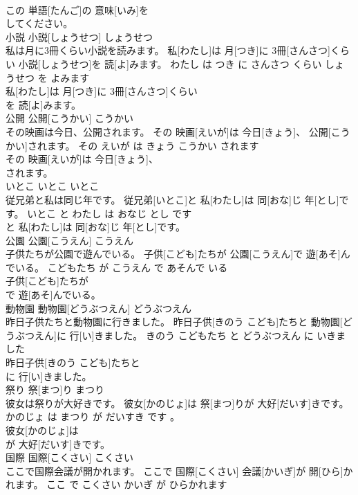 \documentclass[8pt]{extreport}
\begin{document}
\begin{CJK}{UTF8}{min}
\\	この 単語[たんご]の 意味[いみ]を
\\	してください。			
\\	小説	小説[しょうせつ]	しょうせつ	
\\	私は月に3冊くらい小説を読みます。	私[わたし]は 月[つき]に 3冊[さんさつ]くらい 小説[しょうせつ]を 読[よ]みます。	わたし は つき に さんさつ くらい しょうせつ を よみます	
\\	私[わたし]は 月[つき]に 3冊[さんさつ]くらい
\\	を 読[よ]みます。			
\\	公開	公開[こうかい]	こうかい	
\\	その映画は今日、公開されます。	その 映画[えいが]は 今日[きょう]、 公開[こうかい]されます。	その えいが は きょう こうかい されます	
\\	その 映画[えいが]は 今日[きょう]、
\\	されます。			
\\	いとこ	いとこ	いとこ	
\\	従兄弟と私は同じ年です。	従兄弟[いとこ]と 私[わたし]は 同[おな]じ 年[とし]です。	いとこ と わたし は おなじ とし です	
\\	と 私[わたし]は 同[おな]じ 年[とし]です。			
\\	公園	公園[こうえん]	こうえん	
\\	子供たちが公園で遊んでいる。	子供[こども]たちが 公園[こうえん]で 遊[あそ]んでいる。	こどもたち が こうえん で あそんで いる	
\\	子供[こども]たちが
\\	で 遊[あそ]んでいる。			
\\	動物園	動物園[どうぶつえん]	どうぶつえん	
\\	昨日子供たちと動物園に行きました。	昨日子供[きのう こども]たちと 動物園[どうぶつえん]に 行[い]きました。	きのう こどもたち と どうぶつえん に いきました	
\\	昨日子供[きのう こども]たちと
\\	に 行[い]きました。			
\\	祭り	祭[まつ]り	まつり	
\\	彼女は祭りが大好きです。	彼女[かのじょ]は 祭[まつ]りが 大好[だいす]きです。	かのじょ は まつり が だいすき です 。	
\\	彼女[かのじょ]は
\\	が 大好[だいす]きです。			
\\	国際	国際[こくさい]	こくさい	
\\	ここで国際会議が開かれます。	ここで 国際[こくさい] 会議[かいぎ]が 開[ひら]かれます。	ここ で こくさい かいぎ が ひらかれます	

\end{CJK}
\end{document}
